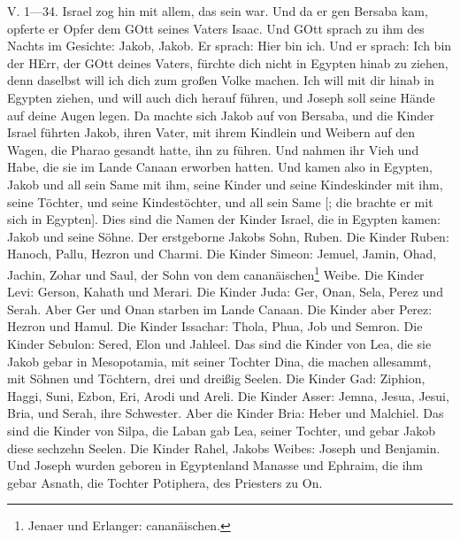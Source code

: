 \begin{schriftzitat}
V. 1—34. Israel zog hin mit allem, das sein war. Und da er gen Bersaba kam, opferte er Opfer dem GOtt seines Vaters Isaac. Und GOtt sprach zu ihm des Nachts im Gesichte: Jakob, Jakob. Er sprach: Hier bin ich. Und er sprach: Ich bin der HErr, der GOtt deines Vaters, fürchte dich nicht in Egypten hinab zu ziehen, denn daselbst will ich dich zum großen Volke machen. Ich will mit dir hinab in Egypten ziehen, und will auch dich herauf führen, und Joseph soll seine Hände auf deine Augen legen. Da machte sich Jakob auf von Bersaba, und die Kinder Israel führten Jakob, ihren Vater, mit ihrem Kindlein und Weibern auf den Wagen, die Pharao gesandt hatte, ihn zu führen. Und nahmen ihr Vieh und Habe, die sie im Lande Canaan erworben hatten. Und kamen also in Egypten, Jakob und all sein Same mit ihm, seine Kinder und seine Kindeskinder mit ihm, seine Töchter, und seine Kindestöchter, und all sein Same [; die brachte er mit sich in Egypten]. Dies sind die Namen der Kinder Israel, die in Egypten kamen: Jakob und seine Söhne. Der erstgeborne Jakobs Sohn, Ruben. Die Kinder Ruben: Hanoch, Pallu, Hezron und Charmi. Die Kinder Simeon: Jemuel, Jamin, Ohad, Jachin, Zohar und Saul, der Sohn von dem cananäischen\footnote{Jenaer und Erlanger: cananäischen.} Weibe. Die Kinder Levi: Gerson, Kahath und Merari. Die Kinder Juda: Ger, Onan, Sela, Perez und Serah. Aber Ger und Onan starben im Lande Canaan. Die Kinder aber Perez: Hezron und Hamul. Die Kinder Issachar: Thola, Phua, Job und Semron. Die Kinder Sebulon: Sered, Elon und Jahleel. Das sind die Kinder von Lea, die sie Jakob gebar in Mesopotamia, mit seiner Tochter Dina, die machen allesammt, mit Söhnen und Töchtern, drei und dreißig Seelen. Die Kinder Gad: Ziphion, Haggi, Suni, Ezbon, Eri, Arodi und Areli. Die Kinder Asser: Jemna, Jesua, Jesui, Bria, und Serah, ihre Schwester. Aber die Kinder Bria: Heber und Malchiel. Das sind die Kinder von Silpa, die Laban gab Lea, seiner Tochter, und gebar Jakob diese sechzehn Seelen. Die Kinder Rahel, Jakobs Weibes: Joseph und Benjamin. Und Joseph wurden geboren in Egyptenland Manasse und Ephraim, die ihm gebar Asnath, die Tochter Potiphera, des Priesters zu On.

\end{schriftzitat}
